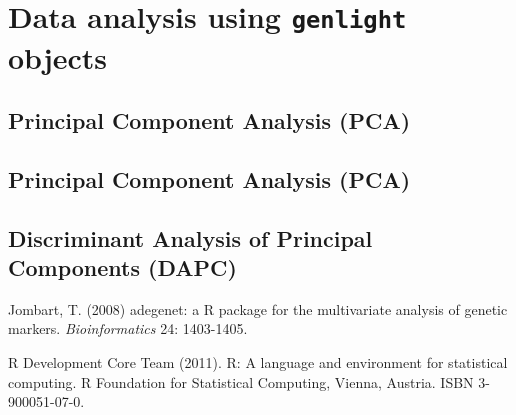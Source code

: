 \documentclass{article}
\begin{document}








\section{Data analysis using \texttt{genlight} objects}


\subsection{Principal Component Analysis (PCA)}



\subsection{Principal Component Analysis (PCA)}



\subsection{Discriminant Analysis of Principal Components (DAPC)}







\begin{thebibliography}{9}

  Jombart, T. (2008) adegenet: a R package for the multivariate
  analysis of genetic markers. \textit{Bioinformatics} 24: 1403-1405.

  R Development Core Team (2011). R: A language and environment for
  statistical computing. R Foundation for Statistical Computing,
  Vienna, Austria. ISBN 3-900051-07-0.

\end{thebibliography}
\end{document}
